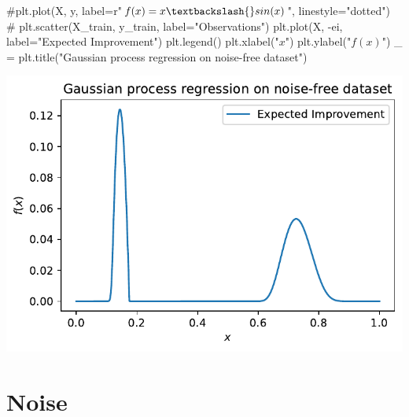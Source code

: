 \documentclass[
  letterpaper,
  DIV=11,
  numbers=noendperiod]{scrreprt}
\newenvironment{Shaded}{\begin{snugshade}}{\end{snugshade}}
\newcommand{\CommentTok}[1]{\textcolor[rgb]{0.37,0.37,0.37}{#1}}
\newcommand{\NormalTok}[1]{\textcolor[rgb]{0.00,0.23,0.31}{#1}}
\newcommand{\OperatorTok}[1]{\textcolor[rgb]{0.37,0.37,0.37}{#1}}
\newcommand{\StringTok}[1]{\textcolor[rgb]{0.13,0.47,0.30}{#1}}
\begin{document}
\begin{Shaded}
\begin{Highlighting}[]
\CommentTok{\#plt.plot(X, y, label=r"$f(x) = x \textbackslash{}sin(x)$", linestyle="dotted")}
\CommentTok{\# plt.scatter(X\_train, y\_train, label="Observations")}
\NormalTok{plt.plot(X, }\OperatorTok{{-}}\NormalTok{ei, label}\OperatorTok{=}\StringTok{"Expected Improvement"}\NormalTok{)}
\NormalTok{plt.legend()}
\NormalTok{plt.xlabel(}\StringTok{"$x$"}\NormalTok{)}
\NormalTok{plt.ylabel(}\StringTok{"$f(x)$"}\NormalTok{)}
\NormalTok{\_ }\OperatorTok{=}\NormalTok{ plt.title(}\StringTok{"Gaussian process regression on noise{-}free dataset"}\NormalTok{)}
\end{Highlighting}
\end{Shaded}

\includegraphics{012_num_spot_ei_files/figure-pdf/cell-48-output-1.pdf}

\section{Noise}\label{noise}
\end{document}
